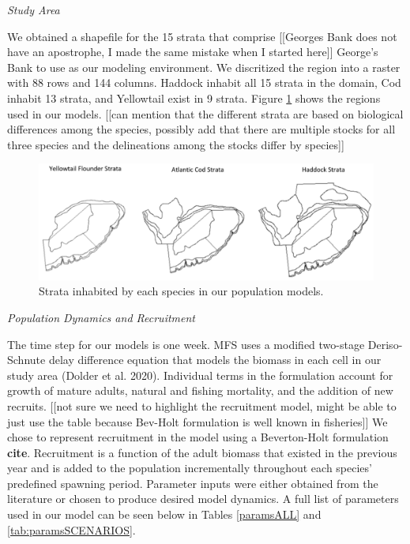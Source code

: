 \documentclass[
  12pt,
]{article}
\begin{document}
\emph{Study Area}

We obtained a shapefile for the 15 strata that comprise {[}{[}Georges Bank does not have an apostrophe, I made the same mistake when I started here{]}{]} George's Bank to use as our modeling environment. We discritized the region into a raster with 88 rows and 144 columns. Haddock inhabit all 15 strata in the domain, Cod inhabit 13 strata, and Yellowtail exist in 9 strata. Figure \ref{fig:strata-plot} shows the regions used in our models. {[}{[}can mention that the different strata are based on biological differences among the species, possibly add that there are multiple stocks for all three species and the delineations among the stocks differ by species{]}{]}

\begin{figure}

{\centering \includegraphics[width=0.95\linewidth]{Images/Strata} 

}

\caption{Strata inhabited by each species in our population models.}\label{fig:strata-plot}
\end{figure}

\emph{Population Dynamics and Recruitment}

The time step for our models is one week. MFS uses a modified two-stage Deriso-Schnute delay difference equation that models the biomass in each cell in our study area (Dolder et al. 2020). Individual terms in the formulation account for growth of mature adults, natural and fishing mortality, and the addition of new recruits. {[}{[}not sure we need to highlight the recruitment model, might be able to just use the table because Bev-Holt formulation is well known in fisheries{]}{]} We chose to represent recruitment in the model using a Beverton-Holt formulation \textbf{cite}. Recruitment is a function of the adult biomass that existed in the previous year and is added to the population incrementally throughout each species' predefined spawning period. Parameter inputs were either obtained from the literature or chosen to produce desired model dynamics. A full list of parameters used in our model can be seen below in Tables \ref{paramsALL} and \ref{tab:paramsSCENARIOS}.
\end{document}
